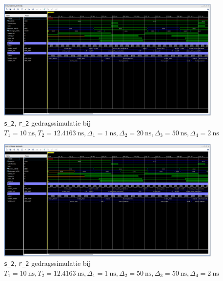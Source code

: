 \documentclass[titlepage]{article}
\begin{document}
\begin{figure}[htpb]
    \centering
    \includegraphics[trim={0 375px 0 0}, clip, width =\linewidth]{sr2_gedragssimulatie_10_12_1_20_50_2.PNG}
    \caption{\texttt{s\_2}, \texttt{r\_2} gedragssimulatie bij \(T_1 = \SI{10}{\nano\second}, T_2 = \SI{12.4163}{\nano\second},
    \Delta_1 = \SI{1}{\nano\second}, \Delta_2 = \SI{20}{\nano\second}, \Delta_3 = \SI{50}{\nano\second}, \Delta_4 = \SI{2}{\nano\second} \)}
    \label{fig:sr2_behav_10_12_1_20_50_2}
\end{figure}

\begin{figure}[htpb]
    \centering
    \includegraphics[trim={0 375px 0 0}, clip, width =\linewidth]{sr2_gedragssimulatie_10_12_1_50_50_2.PNG}
    \caption{\texttt{s\_2}, \texttt{r\_2} gedragssimulatie bij \(T_1 = \SI{10}{\nano\second}, T_2 = \SI{12.4163}{\nano\second},
    \Delta_1 = \SI{1}{\nano\second}, \Delta_2 = \SI{50}{\nano\second}, \Delta_3 = \SI{50}{\nano\second}, \Delta_4 = \SI{2}{\nano\second} \)}
    \label{fig:sr2_behav_10_12_1_50_50_2}
\end{figure}
\end{document}
